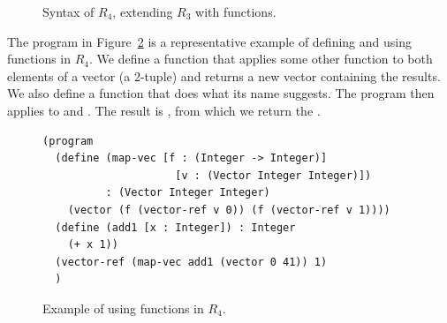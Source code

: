 \documentclass[11pt]{book}
\newcommand{\gray}[1]{{\color{lightgray} #1}}
\begin{document}
\begin{figure}[tp]
\centering
\fbox{
\begin{minipage}{0.96\textwidth}
\[
\begin{array}{lcl}
  \Type &::=& \gray{ \key{Integer} \mid \key{Boolean}
         \mid (\key{Vector}\;\Type^{+}) \mid \key{Void}  } \mid (\Type^{*} \; \key{->}\; \Type) \\
\itm{cmp} &::= & \gray{  \key{eq?} \mid \key{<} \mid \key{<=} \mid \key{>} \mid \key{>=}  } \\
  \Exp &::=& \gray{ \Int \mid (\key{read}) \mid (\key{-}\;\Exp) \mid (\key{+} \; \Exp\;\Exp)}  \\
     &\mid&  \gray{ \Var \mid \LET{\Var}{\Exp}{\Exp} }\\
    &\mid& \gray{ \key{\#t} \mid \key{\#f} \mid
      (\key{and}\;\Exp\;\Exp) \mid (\key{not}\;\Exp)} \\
      &\mid& \gray{(\itm{cmp}\;\Exp\;\Exp) \mid \IF{\Exp}{\Exp}{\Exp}} \\
  &\mid& \gray{(\key{vector}\;\Exp^{+}) \mid
    (\key{vector-ref}\;\Exp\;\Int)} \\
  &\mid& \gray{(\key{vector-set!}\;\Exp\;\Int\;\Exp)\mid (\key{void})} \\
      &\mid& (\Exp \; \Exp^{*}) \\
  \Def &::=& (\key{define}\; (\Var \; [\Var \key{:} \Type]^{*}) \key{:} \Type \; \Exp) \\
  R_4 &::=& (\key{program} \; \Def^{*} \; \Exp)
\end{array}
\]
\end{minipage}
}
\caption{Syntax of $R_4$, extending $R_3$ with functions.}
\label{fig:r4-syntax}
\end{figure}

The program in Figure~\ref{fig:r4-function-example} is a
representative example of defining and using functions in $R_4$.  We
define a function  that applies some other function
 to both elements of a vector (a 2-tuple) and returns a new
vector containing the results. We also define a function 
that does what its name suggests. The program then applies
 to  and .  The result is
, from which we return the .

\begin{figure}[tbp]
\begin{lstlisting}
(program
  (define (map-vec [f : (Integer -> Integer)]
                     [v : (Vector Integer Integer)])
          : (Vector Integer Integer)
    (vector (f (vector-ref v 0)) (f (vector-ref v 1))))
  (define (add1 [x : Integer]) : Integer
    (+ x 1))
  (vector-ref (map-vec add1 (vector 0 41)) 1)
  )
\end{lstlisting}
\caption{Example of using functions in $R_4$.}
\label{fig:r4-function-example}
\end{figure}
\end{document}
